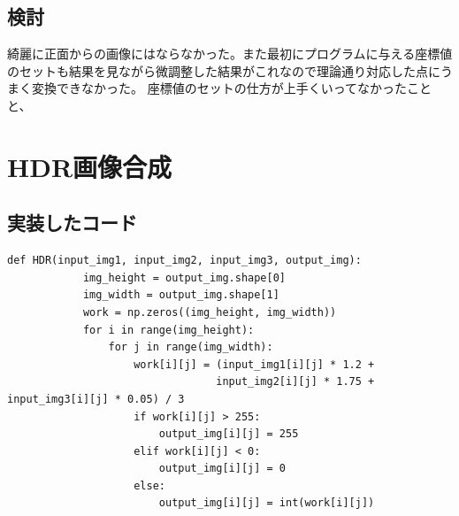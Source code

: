\documentclass[11pt,a4j]{jsarticle}
\begin{document}
    \subsection{検討}
    綺麗に正面からの画像にはならなかった。また最初にプログラムに与える座標値のセットも結果を見ながら微調整した結果がこれなので理論通り対応した点にうまく変換できなかった。
    座標値のセットの仕方が上手くいってなかったことと、
    \section{HDR画像合成}
    \subsection{実装したコード}
    \begin{lstlisting}[basicstyle=\ttfamily\footnotesize, frame=single]
        def HDR(input_img1, input_img2, input_img3, output_img):
            img_height = output_img.shape[0]
            img_width = output_img.shape[1]
            work = np.zeros((img_height, img_width))
            for i in range(img_height):
                for j in range(img_width):
                    work[i][j] = (input_img1[i][j] * 1.2 +
                                 input_img2[i][j] * 1.75 + input_img3[i][j] * 0.05) / 3
                    if work[i][j] > 255:
                        output_img[i][j] = 255
                    elif work[i][j] < 0:
                        output_img[i][j] = 0
                    else:
                        output_img[i][j] = int(work[i][j])
    \end{lstlisting}
\end{document}
